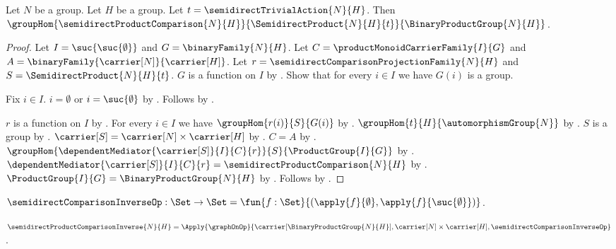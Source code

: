 \begin{theorem}\label{semidirect_product_comparison_hom}
    Let $N$ be a group.
    Let $H$ be a group.
    Let $t=\semidirectTrivialAction{N}{H}$.
    Then
        $\groupHom{\semidirectProductComparison{N}{H}}
            {\SemidirectProduct{N}{H}{t}}{\BinaryProductGroup{N}{H}}$.
\end{theorem}
\begin{proof}
    Let $I=\suc{\suc{\emptyset}}$ and $G=\binaryFamily{N}{H}$.
    Let $C=\productMonoidCarrierFamily{I}{G}$ and
        $A=\binaryFamily{\carrier[N]}{\carrier[H]}$.
    Let $r=\semidirectComparisonProjectionFamily{N}{H}$ and
        $S=\SemidirectProduct{N}{H}{t}$.
    $G$ is a function on $I$ by
        .
    Show that for every $i\in I$ we have $G(i)$ is a group.
    \begin{subproof}
        Fix $i\in I$.
        $i=\emptyset$ or $i=\suc{\emptyset}$ by
            .
        Follows by .
    \end{subproof}
    $r$ is a function on $I$ by
        .
    For every $i\in I$ we have $\groupHom{r(i)}{S}{G(i)}$ by
        .
    $\groupHom{t}{H}{\automorphismGroup{N}}$ by
        .
    $S$ is a group by .
    $\carrier[S]=\carrier[N]\times\carrier[H]$ by
        .
    $C=A$ by .
    $\groupHom{\dependentMediator{\carrier[S]}{I}{C}{r}}
        {S}{\ProductGroup{I}{G}}$ by
        .
    $\dependentMediator{\carrier[S]}{I}{C}{r}=
        \semidirectProductComparison{N}{H}$ by
        .
    $\ProductGroup{I}{G}=\BinaryProductGroup{N}{H}$ by
        .
    Follows by \auto.
\end{proof}

\begin{definition}\label{semidirect_comparison_inverse_op}
    $\semidirectComparisonInverseOp:\Set\to\Set
        =\fun{f:\Set}{
            (\apply{f}{\emptyset},\apply{f}{\suc{\emptyset}})}$.
\end{definition}

\begin{definition}\label{semidirect_product_comparison_inverse}
    $\semidirectProductComparisonInverse{N}{H}=
        \Apply{\graphOnOp}
            {\carrier[\BinaryProductGroup{N}{H}],
             \carrier[N]\times\carrier[H],
             \semidirectComparisonInverseOp}$.
\end{definition}

